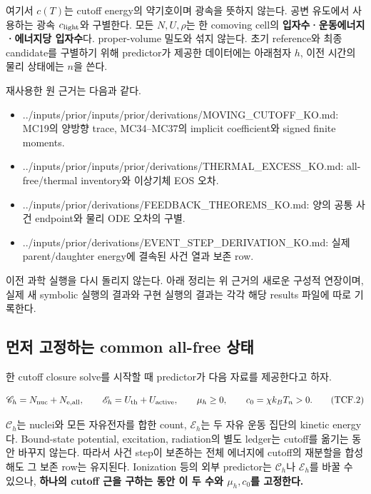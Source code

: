 여기서 \(c(T)\)는 cutoff energy의 약기호이며 광속을 뜻하지 않는다. 공변 유도에서 사용하는 광속 \(c_{\rm light}\)와 구별한다. 모든 \(N,U,\rho\)는 한 comoving cell의 \textbf{입자수·운동에너지·에너지당 입자수}다. proper-volume 밀도와 섞지 않는다. 초기 reference와 최종 candidate를 구별하기 위해 predictor가 제공한 데이터에는 아래첨자 \(h\), 이전 시간의 물리 상태에는 \(n\)을 쓴다.

재사용한 원 근거는 다음과 같다.

\begin{itemize}
\tightlist
\item
  ../inputs/prior/inputs/prior/derivations/MOVING\_CUTOFF\_KO.md: MC19의 양방향 trace, MC34--MC37의 implicit coefficient와 signed finite moments.
\item
  ../inputs/prior/inputs/prior/derivations/THERMAL\_EXCESS\_KO.md: all-free/thermal inventory와 이상기체 EOS 오차.
\item
  ../inputs/prior/derivations/FEEDBACK\_THEOREMS\_KO.md: 양의 공통 사건 endpoint와 물리 ODE 오차의 구별.
\item
  ../inputs/prior/derivations/EVENT\_STEP\_DERIVATION\_KO.md: 실제 parent/daughter energy에 결속된 사건 열과 보존 row.
\end{itemize}

이전 과학 실행을 다시 돌리지 않는다. 아래 정리는 위 근거의 새로운 구성적 연장이며, 실제 새 symbolic 실행의 결과와 구현 실행의 결과는 각각 해당 results 파일에 따로 기록한다.

\hypertarget{uxba3cuxc800-uxace0uxc815uxd558uxb294-common-all-free-uxc0c1uxd0dc}{%
\subsection{먼저 고정하는 common all-free 상태}\label{uxba3cuxc800-uxace0uxc815uxd558uxb294-common-all-free-uxc0c1uxd0dc}}

한 cutoff closure solve를 시작할 때 predictor가 다음 자료를 제공한다고 하자.

\[
\mathscr C_h=N_{\rm nuc}+N_{\rm e,all},\qquad
\mathscr E_h=U_{\rm th}+U_{\rm active},\qquad
\mu_h\ge0,\qquad c_0=\chi k_BT_n>0 .
\tag{TCF.2}
\]

\(\mathscr C_h\)는 nuclei와 모든 자유전자를 합한 count, \(\mathscr E_h\)는 두 자유 운동 집단의 kinetic energy다. Bound-state potential, excitation, radiation의 별도 ledger는 cutoff를 옮기는 동안 바꾸지 않는다. 따라서 사건 step이 보존하는 전체 에너지에 cutoff의 재분할을 합성해도 그 보존 row는 유지된다. Ionization 등의 외부 predictor는 \(\mathscr C_h\)나 \(\mathscr E_h\)를 바꿀 수 있으나, \textbf{하나의 cutoff 근을 구하는 동안 이 두 수와 \(\mu_h,c_0\)를 고정한다.}

